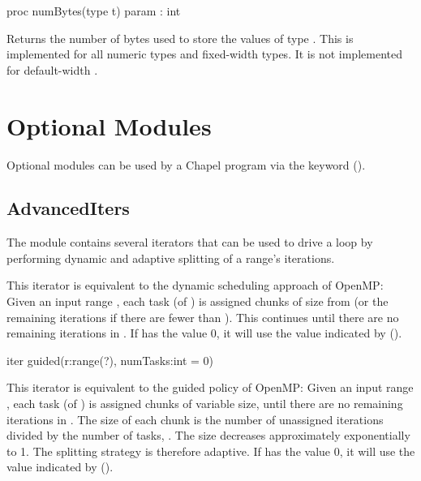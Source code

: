 \begin{protohead}
proc numBytes(type t) param : int
\end{protohead}
\begin{protobody}
Returns the number of bytes used to store the values of type .
This is implemented for all numeric types and fixed-width  types.
It is not implemented for default-width .
\end{protobody}



\section{Optional Modules}

Optional modules can be used by a Chapel program via the 
keyword ().


\subsection{AdvancedIters}
\label{AdvancedIters}

The  module contains several iterators that can be
used to drive a  loop by performing dynamic and adaptive splitting
of a range's iterations.

\begin{protohead}
iter dynamic(r:range(?), chunkSize:int, numTasks:int=0) {
\end{protohead}
\begin{protobody}

  This iterator is equivalent to the dynamic scheduling approach of
  OpenMP: Given an input range , each task (of
  ) is assigned chunks of size  from
   (or the remaining iterations if there are fewer than
  ). This continues until there are no remaining
  iterations in .  If  has the value 0, it will
  use the value indicated by 
  ().

\end{protobody}

\begin{protohead}
iter guided(r:range(?), numTasks:int = 0)
\end{protohead}
\begin{protobody}
  This iterator is equivalent to the guided policy of OpenMP: Given an
  input range , each task (of ) is assigned
  chunks of variable size, until there are no remaining iterations in
  . The size of each chunk is the number of unassigned
  iterations divided by the number of tasks, . The size
  decreases approximately exponentially to 1. The splitting strategy
  is therefore adaptive.  If  has the value 0, it will
  use the value indicated by 
  ().

\end{protobody}


